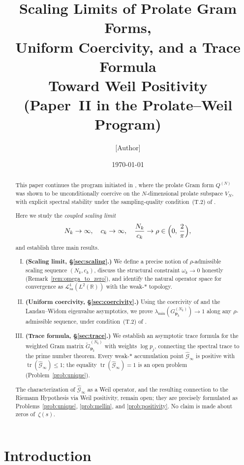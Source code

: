 \documentclass[12pt,a4paper]{amsart}
\title[Scaling Limits, Uniform Coercivity, and Trace Formula]
{Scaling Limits of Prolate Gram Forms,\\
Uniform Coercivity, and a Trace Formula\\
Toward Weil Positivity\\[4pt]
\large (Paper~II in the Prolate--Weil Program)}
\author{[Author]}
\date{\today}
\theoremstyle{definition}
\newcommand{\GVMk}{G^{(N_k)}_{\mathbf{p}_k}}
\newcommand{\GVMkw}{\widetilde{G}^{(N_k)}_{\mathbf{p}_k}}
\newcommand{\Lcal}{\mathcal{L}^1_{\mathrm{sa}}}
\newcommand{\Gcal}{\widehat{\mathcal{G}}}
\begin{document}
\begin{abstract}
This paper continues the program initiated in \cite{PaperI}, where the
prolate Gram form $Q^{(N)}$ was shown to be unconditionally coercive on
the $N$-dimensional prolate subspace $V_N$, with explicit spectral
stability under the sampling-quality condition~(T.2) of \cite{PaperI}.

Here we study the \emph{coupled scaling limit}
\[
  N_k \to \infty,\quad c_k \to \infty,\quad
  \frac{N_k}{c_k} \to \rho \in \Bigl(0,\,\frac{2}{\pi}\Bigr),
\]
and establish three main results.
\begin{enumerate}[(I)]
\item \textbf{(Scaling limit, \S\ref{sec:scaling}.)} We define a
precise notion of $\rho$-admissible scaling sequence $(N_k,c_k)$,
discuss the structural constraint $\omega_k\to0$ honestly
(Remark~\ref{rem:omega_to_zero}), and identify the natural operator
space for convergence as $\Lcal(L^2(\mathbb{R}))$ with the
weak-$*$ topology.
\item \textbf{(Uniform coercivity, \S\ref{sec:coercivity}.)} Using
the coercivity of \cite[Thm.~1]{PaperI} and the Landau--Widom
eigenvalue asymptotics, we prove $\lambda_{\min}(\GVMk)\to1$ along
any $\rho$-admissible sequence, under condition~(T.2) of \cite{PaperI}.
\item \textbf{(Trace formula, \S\ref{sec:trace}.)} We establish
an asymptotic trace formula for the weighted Gram matrix
$\GVMkw$ with weights $\log p_j$, connecting the spectral trace
to the prime number theorem. Every weak-$*$ accumulation point
$\Gcal_\infty$ is positive with $\operatorname{tr}(\Gcal_\infty)\leq1$;
the equality $\operatorname{tr}(\Gcal_\infty)=1$ is an open problem
(Problem~\ref{prob:unique}).
\end{enumerate}
The characterization of $\Gcal_\infty$ as a Weil operator, and the
resulting connection to the Riemann Hypothesis via Weil positivity,
remain open; they are precisely formulated as
Problems~\ref{prob:unique}, \ref{prob:mellin}, and
\ref{prob:positivity}.
No claim is made about zeros of~$\zeta(s)$.
\end{abstract}

\maketitle
\tableofcontents

\section{Introduction}\label{sec:intro}
\end{document}
